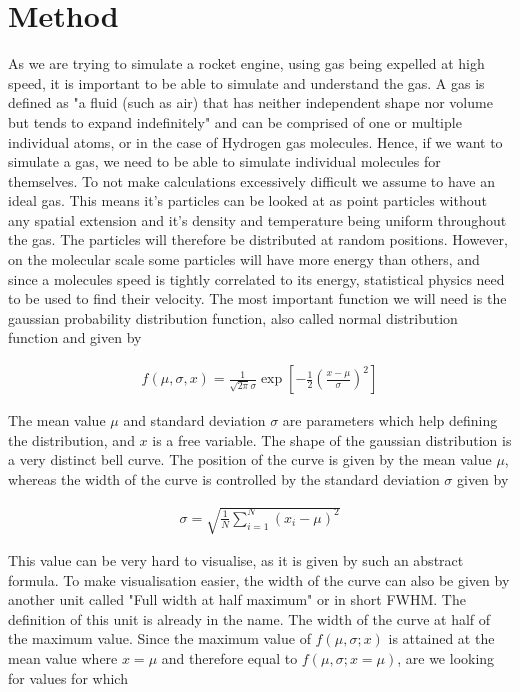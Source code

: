 \documentclass[reprint,english,notitlepage]{revtex4-2}
\begin{document}
\section{Method}
As we are trying to simulate a rocket engine, using gas being expelled at high speed, it is important to be able to simulate and understand the gas.
A gas is defined as "a fluid (such as air) that has neither independent shape nor volume but tends to expand indefinitely"
and can be comprised of one or multiple individual atoms, or in the case of Hydrogen gas molecules.
Hence, if we want to simulate a gas, we need to be able to simulate individual molecules for themselves.
To not make calculations excessively difficult we assume to have an ideal gas.
This means it's particles can be looked at as point particles without any spatial extension and it's density and temperature being uniform throughout the gas.
The particles will therefore be distributed at random positions.
However, on the molecular scale some particles will have more energy than others, and since a molecules speed is tightly correlated to its energy, statistical physics need to be used to find their velocity.
The most important function we will need is the gaussian probability distribution function, also called normal distribution function and given by

\begin{align}
    f(\mu, \sigma, x) = \frac{1}{\sqrt{2\pi}\sigma} \exp \left[-\frac{1}{2}\left(\frac{x-\mu}{\sigma}\right)^2 \right] \label{Normal_Distribution}
\end{align}

The mean value $\mu$ and standard deviation $\sigma$ are parameters which help defining the distribution, and $x$ is a free variable.
The shape of the gaussian distribution is a very distinct bell curve. The position of the curve is given by the mean value $\mu$, whereas the width of the curve is controlled by the standard deviation $\sigma$ given by

\begin{align*}
    \sigma = \sqrt{\frac{1}{N}\sum_{i = 1}^{N} \left(x_i-\mu \right)^2}
\end{align*}

This value can be very hard to visualise, as it is given by such an abstract formula.
To make visualisation easier, the width of the curve can also be given by another unit called "Full width at half maximum" or in short FWHM.
The definition of this unit is already in the name. The width of the curve at half of the maximum value.
Since the maximum value of $f(\mu, \sigma; x)$ is attained at the mean value where $x=\mu$ and therefore equal to $f(\mu, \sigma; x=\mu)$, are we looking for values for which
\end{document}
